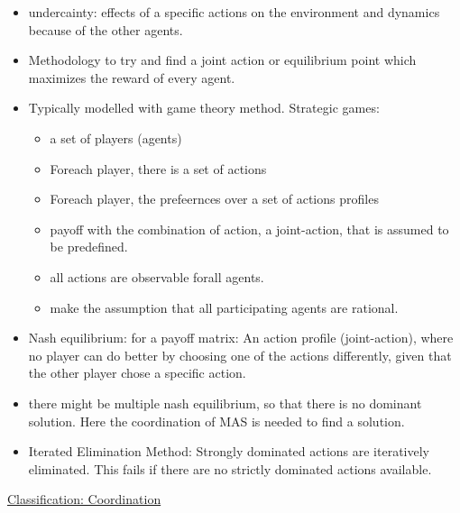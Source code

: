 \begin{itemize}[noitemsep,nolistsep]
	\item undercainty: effects of a specific actions on the environment and dynamics because of the other agents.
	\item Methodology to try and find a joint action or equilibrium point which maximizes the reward of every agent.
	\item Typically modelled with game theory method. Strategic games:
	\begin{itemize}[noitemsep,nolistsep]
		\item a set of players (agents)
		\item Foreach player, there is a set of actions
		\item Foreach player, the prefeernces over a set of actions profiles
		\item payoff with the combination of action, a joint-action, that is assumed to be predefined.
		\item all actions are observable forall agents.
		\item make the assumption that all participating agents are rational.
	\end{itemize}
	\item Nash equilibrium: for a payoff matrix: An action profile (joint-action), where no player can do better by choosing one of the actions differently, given that the other player chose a specific action.
	\item there might be multiple nash equilibrium, so that there is no dominant solution. Here the coordination of MAS is needed to find a solution.
	\item Iterated Elimination Method: Strongly dominated actions are iteratively eliminated. This fails if there are no strictly dominated actions available.
\end{itemize}
\underline{Classification: Coordination}
